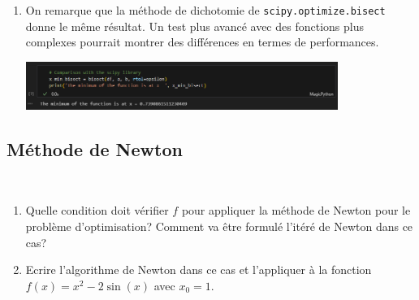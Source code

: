 {\begin{td-sol}
\begin{enumerate}
            Pour obtenir le nombre d'itérations à partir de la précision, on utilise la formule
            \begin{equation*}
                n = \frac{\log(\frac{b - a}{\varepsilon})}{\log(2)},
            \end{equation*}
            où \(n\) est le nombre d'itérations, \(a\) et \(b\) sont les bornes de l'intervalle et \(\varepsilon\) est la précision.
            
            \item On remarque que la méthode de dichotomie de \texttt{scipy.optimize.bisect} donne le même résultat. Un test plus avancé avec des fonctions plus complexes pourrait montrer des différences en termes de performances.
            \begin{center}
                \includegraphics[width=0.8\textwidth]{../assets/code_03_bisect.png}
            \end{center}
        \end{enumerate}
    \end{td-sol}
}{}

\subsection{Méthode de Newton}\label{exo:2}

\begin{td-exo}\,
    \begin{enumerate}
        \item Quelle condition doit vérifier \(f\) pour appliquer la méthode de Newton
        pour le problème d'optimisation? Comment va être formulé l'itéré de Newton dans ce cas?

        \item Ecrire l'algorithme de Newton dans ce cas et l'appliquer à la fonction 
        \(f(x) = x^2 - 2\sin(x)\) avec \(x_0 = 1\).
    \end{enumerate}
\end{td-exo}

